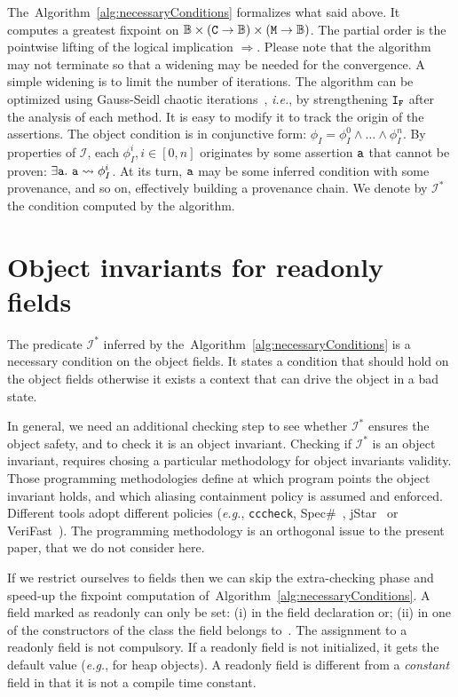 \documentclass{llncs}
\newcommand{\refAlg}[1]{Algorithm~\ref{alg:#1}}
\newcommand{\cccheck}{\texttt{cccheck}}
\begin{document}
The~\refAlg{necessaryConditions} formalizes what said above.
It computes a greatest fixpoint on $\mathbb{B} \times (\mathtt{C} \rightarrow \mathbb{B}) \times (\mathtt{M} \rightarrow \mathbb{B})$.
The partial order is the pointwise lifting of the logical implication $\Rightarrow$.
Please note that the algorithm  may not terminate so that a widening may be needed for the convergence. 
A simple widening is to limit the number of iterations.
The algorithm can be optimized using Gauss-Seidl chaotic iterations~\cite{Cousot77}, \emph{i.e.}, by strengthening $\mathtt{I}_{\mathtt{F}}$ after the analysis of each  method.
It is easy to modify it to track the origin of the assertions.
The object condition is in conjunctive form: $\phi_I = \phi^0_I \wedge \dots \wedge \phi^{n}_I$.
By properties of $\mathcal{I}$, each $ \phi^i_I, i \in [0, n]$ originates by some assertion $\mathtt{a}$ that cannot be proven: $\exists \code{a}.\ \code{a} \leadsto \phi^i_I$.
At its turn, $\mathtt{a}$ may be some inferred condition with some provenance, and so on, effectively building a provenance chain.
We denote by $\mathcal{I}^*$ the condition computed by the algorithm.



\section{Object invariants for readonly fields}

The predicate $\mathcal{I}^*$ inferred by the~\refAlg{necessaryConditions}  is a necessary condition on the object fields. 
It states a condition that should hold on the object fields otherwise it exists a context that can drive the object in a bad state.

In general, we need an additional checking step to see whether $\mathcal{I}^*$ ensures the object safety, and to check it is an object invariant.
Checking if $\mathcal{I}^*$ is an object invariant, requires chosing a particular methodology for object invariants validity.
Those programming  methodologies define at which program points the object invariant holds, and which aliasing containment policy is assumed and enforced.
Different tools adopt different policies (\emph{e.g.}, \cccheck, Spec\#~\cite{SpecSharp}, jStar~\cite{jstar} or Veri\-Fast~\cite{Verifast}).
The programming methodology is an orthogonal issue to the present paper, that we do not consider here.

If we restrict ourselves to  fields then we can skip the extra-checking phase and speed-up the fixpoint computation of~\refAlg{necessaryConditions}. 
A field marked as readonly can only be set: (i) in the field declaration or; (ii)  in one of the constructors of the class the field belongs to~\cite{cSharp}.
The assignment to a readonly field is not compulsory. 
If a readonly field is not initialized, it gets the default value (\emph{e.g.},  for heap objects).
A readonly field is different from a \emph{constant} field in that it is not a compile time constant.
\end{document}
